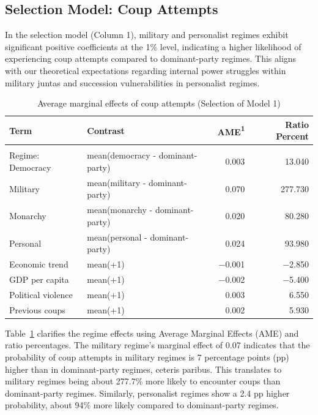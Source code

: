 \documentclass[
  12pt,
]{report}
\begin{document}
\subsection{Selection Model: Coup
Attempts}\label{selection-model-coup-attempts}

In the selection model (Column 1), military and personalist regimes
exhibit significant positive coefficients at the 1\% level, indicating a
higher likelihood of experiencing coup attempts compared to
dominant-party regimes. This aligns with our theoretical expectations
regarding internal power struggles within military juntas and succession
vulnerabilities in personalist regimes.

\begin{longtable}[]{@{}llrr@{}}

\caption{\label{tbl-mfx1}Average marginal effects of coup attempts
(Selection of Model 1)}

\tabularnewline

\toprule\noalign{}
Term & Contrast & AME{\textsuperscript{1}} & Ratio Percent \\
\midrule\noalign{}
\endhead
\midrule\noalign{}
\multicolumn{4}{@{}l@{}}{%
{\textsuperscript{1}} AME: Average Marginal Effect} \\
\bottomrule\noalign{}
\endlastfoot
Regime: Democracy & mean(democracy - dominant-party) & 0.003 & 13.040 \\
Military & mean(military - dominant-party) & 0.070 & 277.730 \\
Monarchy & mean(monarchy - dominant-party) & 0.020 & 80.280 \\
Personal & mean(personal - dominant-party) & 0.024 & 93.980 \\
Economic trend & mean(+1) & −0.001 & −2.850 \\
GDP per capita & mean(+1) & −0.002 & −5.400 \\
Political violence & mean(+1) & 0.003 & 6.550 \\
Previous coups & mean(+1) & 0.002 & 5.930 \\

\end{longtable}

Table~\ref{tbl-mfx1} clarifies the regime effects using Average Marginal
Effects (AME) and ratio percentages. The military regime's marginal
effect of 0.07 indicates that the probability of coup attempts in
military regimes is 7 percentage points (pp) higher than in
dominant-party regimes, ceteris paribus. This translates to military
regimes being about 277.7\% more likely to encounter coups than
dominant-party regimes. Similarly, personalist regimes show a 2.4 pp
higher probability, about 94\% more likely compared to dominant-party
regimes.
\end{document}
